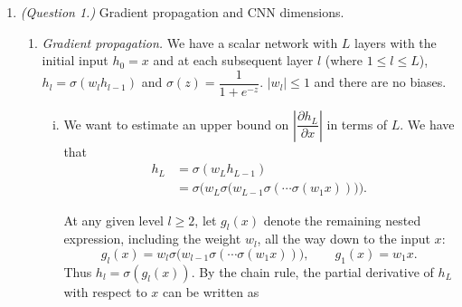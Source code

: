 \documentclass[12pt]{article}
\begin{document}
 
\begin{enumerate}
   \item \emph{(Question 1.)} Gradient propagation and CNN dimensions.
   \begin{enumerate}[label=\textbf{\Alph*.}, leftmargin=*]
   \item \emph{Gradient propagation.} We have a scalar network with $L$ layers with the initial input $h_0 = x$ and at each subsequent layer $l$ (where $1 \leq l \leq L$), $h_l = \sigma (w_lh_{l-1})$ and $\sigma(z) = \dfrac{1}{1+e^{-z}}$. $|w_l| \leq 1$ and there are no biases. 
   
   \begin{enumerate}[(i)]
    \item We want to estimate an upper bound on $\left|\dfrac{\partial h_L}{\partial x}\right|$ in terms of $L$. We have that 
    \[
    \begin{aligned}
        h_L &= \sigma(w_L h_{L-1}) \\
            &= \sigma\bigl(w_L \sigma\bigl(w_{L-1} \sigma(\cdots \sigma(w_1 x))\bigr)\bigr).
    \end{aligned}
    \]

    At any given level $l \geq 2$, let $g_l(x)$ denote the remaining nested expression, including the weight $w_l$, all the way down to the input $x$:
    \[
        g_l(x) = w_l \sigma\bigl(w_{l-1} \sigma(\cdots \sigma(w_1 x))\bigr),
        \qquad g_1(x) = w_1 x.
    \]
    Thus $h_l = \sigma(g_l(x))$. By the chain rule, the partial derivative of $h_L$ with respect to $x$ can be written as


\end{enumerate}
\end{enumerate}
\end{enumerate}
\end{document}
